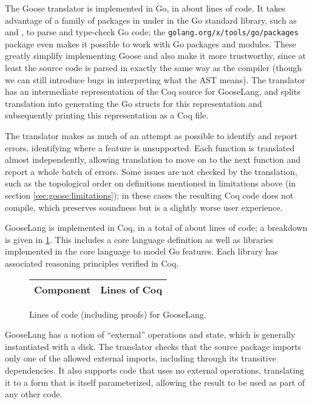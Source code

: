 
The Goose translator is implemented in Go, in about  lines of code.
It takes advantage of a family of packages in under
 in the Go standard library, such as  and , to
parse and type-check Go code; the \texttt{golang.org/x/tools/go/packages} package
even makes it possible to work with Go packages and modules. These greatly
simplify implementing Goose and also make it more trustworthy, since at least
the source code is parsed in exactly the same way as the compiler (though we can
still introduce bugs in interpreting what the AST means).
The translator has an intermediate representation of the Coq source for
GooseLang, and splits translation into generating the Go structs for this
representation and subsequently printing this representation as a Coq file.

The translator makes as much of an attempt as possible to identify and report
errors, identifying where a feature is unsupported. Each function is translated
almost independently, allowing translation to move on to the next function and
report a whole batch of errors. Some issues are not checked by the translation,
such as the topological order on definitions mentioned in limitations above (in
section \cref{sec:goose:limitations}); in these cases the resulting Coq code
does not compile, which preserves soundness but is a slightly worse user
experience.

GooseLang is implemented in Coq, in a total of about  lines of code;
a breakdown is given in \cref{fig:gooselang:lines}.
This includes a core language definition as well as libraries implemented in the
core language to model Go features. Each library has associated reasoning
principles verified in Coq.

\begin{figure}
\centering
\begin{tabular}{lr}
\toprule
\bf Component & \bf Lines of Coq \\
\midrule
  
\end{tabular}
\caption[Lines of code for GooseLang]%
{Lines of code (including proofs) for GooseLang.}
\label{fig:gooselang:lines}
\end{figure}


GooseLang has a notion of ``external'' operations and state, which is generally
instantiated with a disk. The translator checks that the source package imports
only one of the allowed external imports, including through its transitive
dependencies. It also supports code that uses no external operations,
translating it to a form that is itself parameterized, allowing the result to be
used as part of any other code.

